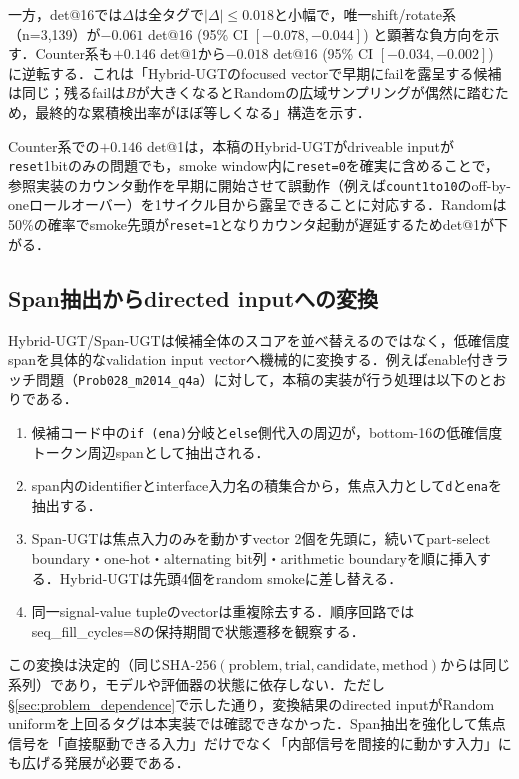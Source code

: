 \documentclass[submit,techrep,noauthor]{ipsj}
\begin{document}
一方，det@16では$\Delta$は全タグで$|\Delta| \le 0.018$と小幅で，唯一shift/rotate系（n=3,139）が$-0.061$ det@16 (95\% CI $[-0.078, -0.044]$) と顕著な負方向を示す．Counter系も$+0.146$ det@1から$-0.018$ det@16 (95\% CI $[-0.034, -0.002]$) に逆転する．これは「Hybrid-UGTのfocused vectorで早期にfailを露呈する候補は同じ；残るfailは$B$が大きくなるとRandomの広域サンプリングが偶然に踏むため，最終的な累積検出率がほぼ等しくなる」構造を示す．

Counter系での$+0.146$ det@1は，本稿のHybrid-UGTがdriveable inputが\texttt{reset}1bitのみの問題でも，smoke window内に\texttt{reset=0}を確実に含めることで，参照実装のカウンタ動作を早期に開始させて誤動作（例えば\texttt{count1to10}のoff-by-oneロールオーバー）を1サイクル目から露呈できることに対応する．Randomは50\%の確率でsmoke先頭が\texttt{reset=1}となりカウンタ起動が遅延するためdet@1が下がる．

\subsection{Span抽出からdirected inputへの変換}\label{sec:span_to_input}

Hybrid-UGT/Span-UGTは候補全体のスコアを並べ替えるのではなく，低確信度spanを具体的なvalidation input vectorへ機械的に変換する．例えばenable付きラッチ問題（\texttt{Prob028\_m2014\_q4a}）に対して，本稿の実装が行う処理は以下のとおりである．

\begin{enumerate}
\item 候補コード中の\texttt{if (ena)}分岐と\texttt{else}側代入の周辺が，bottom-16の低確信度トークン周辺spanとして抽出される．
\item span内のidentifierとinterface入力名の積集合から，焦点入力として\texttt{d}と\texttt{ena}を抽出する．
\item Span-UGTは焦点入力のみを動かすvector 2個を先頭に，続いてpart-select boundary・one-hot・alternating bit列・arithmetic boundaryを順に挿入する．Hybrid-UGTは先頭4個をrandom smokeに差し替える．
\item 同一signal-value tupleのvectorは重複除去する．順序回路ではseq\_fill\_cycles=8の保持期間で状態遷移を観察する．
\end{enumerate}

この変換は決定的（同じ$\text{SHA-256}(\text{problem},\text{trial},\text{candidate},\text{method})$からは同じ系列）であり，モデルや評価器の状態に依存しない．ただし§\ref{sec:problem_dependence}で示した通り，変換結果のdirected inputがRandom uniformを上回るタグは本実装では確認できなかった．Span抽出を強化して焦点信号を「直接駆動できる入力」だけでなく「内部信号を間接的に動かす入力」にも広げる発展が必要である．
\end{document}
